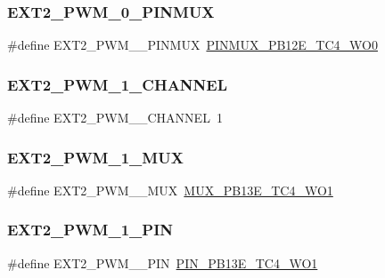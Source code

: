\subsubsection{\texorpdfstring{EXT2\_PWM\_0\_PINMUX}{EXT2\_PWM\_0\_PINMUX}}
{\footnotesize\ttfamily \#define E\+X\+T2\+\_\+\+P\+W\+M\+\_\+\_\+\+P\+I\+N\+M\+UX~\mbox{\hyperlink{pio_2samd21j18a_8h_ad3787c9572bd467c9a9ff56659c03dc2}{P\+I\+N\+M\+U\+X\+\_\+\+P\+B12\+E\+\_\+\+T\+C4\+\_\+\+W\+O0}}}

\mbox{\label{group__samd21__xplained__pro__features__group_ga8230fa68feeedc7a491be3d10c7d6bce}} 
\subsubsection{\texorpdfstring{EXT2\_PWM\_1\_CHANNEL}{EXT2\_PWM\_1\_CHANNEL}}
{\footnotesize\ttfamily \#define E\+X\+T2\+\_\+\+P\+W\+M\+\_\+\_\+\+C\+H\+A\+N\+N\+EL~1}

\mbox{\label{group__samd21__xplained__pro__features__group_ga159afe58057253f3b8fddd70f6101dc8}} 
\subsubsection{\texorpdfstring{EXT2\_PWM\_1\_MUX}{EXT2\_PWM\_1\_MUX}}
{\footnotesize\ttfamily \#define E\+X\+T2\+\_\+\+P\+W\+M\+\_\+\_\+\+M\+UX~\mbox{\hyperlink{pio_2samd21j18a_8h_a1596bf26e7e5238979faa58bb9901666}{M\+U\+X\+\_\+\+P\+B13\+E\+\_\+\+T\+C4\+\_\+\+W\+O1}}}

\mbox{\label{group__samd21__xplained__pro__features__group_ga641bd7ece0fdf2a8cfd49c75ed8f93bc}} 
\subsubsection{\texorpdfstring{EXT2\_PWM\_1\_PIN}{EXT2\_PWM\_1\_PIN}}
{\footnotesize\ttfamily \#define E\+X\+T2\+\_\+\+P\+W\+M\+\_\+\_\+\+P\+IN~\mbox{\hyperlink{pio_2samd21j18a_8h_ab17c34e5d668dc3db35fdfe4ec67c91d}{P\+I\+N\+\_\+\+P\+B13\+E\+\_\+\+T\+C4\+\_\+\+W\+O1}}}

